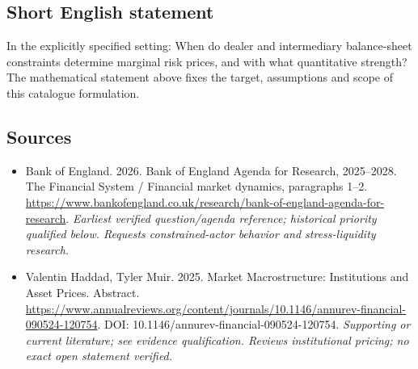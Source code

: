 \documentclass[11pt]{article}
\begin{document}
\subsection{Short English statement}
In the explicitly specified setting: When do dealer and intermediary balance-sheet constraints determine marginal risk prices, and with what quantitative strength? The mathematical statement above fixes the target, assumptions and scope of this catalogue formulation.

\subsection{Sources}
\begin{itemize}\raggedright
\item[\textnormal{[S1]}]\hypertarget{source:30007598:1}{} Bank of England. 2026. Bank of England Agenda for Research, 2025–2028. The Financial System / Financial market dynamics, paragraphs 1–2.
\url{https://www.bankofengland.co.uk/research/bank-of-england-agenda-for-research}.
{\small\textit{Earliest verified question/agenda reference; historical priority qualified below. Requests constrained-actor behavior and stress-liquidity research.}}

\item[\textnormal{[S2]}]\hypertarget{source:30007598:2}{} Valentin Haddad, Tyler Muir. 2025. Market Macrostructure: Institutions and Asset Prices. Abstract.
\url{https://www.annualreviews.org/content/journals/10.1146/annurev-financial-090524-120754}.
DOI: 10.1146/annurev-financial-090524-120754.
{\small\textit{Supporting or current literature; see evidence qualification. Reviews institutional pricing; no exact open statement verified.}}
\end{itemize}
\end{document}
